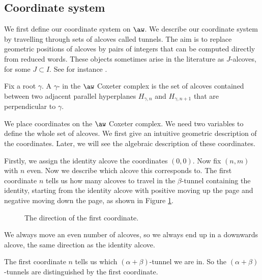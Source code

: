 \documentclass[11pt]{article}
\begin{document}
   



    

\subsection{Coordinate system}





We first define our coordinate system on $\aw$.
We describe our coordinate system by travelling through sets of alcoves called tunnels. The aim is to replace geometric positions of alcoves by pairs of integers that can be computed directly from reduced words. These objects sometimes arise in the literature as $J$-alcoves, for some $J\subset I$. See for instance \cite{GUILHOT}. 
\begin{definition}\label{tunnelsdef}
    Fix a root $\gamma$. A $\gamma$- in the $\aw$ Coxeter complex is the set of alcoves contained between two adjacent parallel hyperplanes $H_{\gamma,n}$ and $H_{\gamma,n+1}$ that are perpendicular to $\gamma$.
\end{definition}

We place coordinates on the $\aw$ Coxeter complex. We need two variables to define the whole set of alcoves. We first give an intuitive geometric description of the coordinates. Later, we will see the algebraic description of these coordinates. 


Firstly, we assign the identity alcove the coordinates $(0,0)$. Now fix $(n,m)$ with $n$ even. Now we describe which alcove this corresponds to. The first coordinate $n$ tells us how many alcoves to travel in the $\beta$-tunnel containing the identity, starting from the identity alcove
with positive moving up the page and negative moving down the page, as shown in Figure \ref{fig4}.
\begin{figure}[!htbp]
    \centering
    \def\svgwidth{0.4\textwidth}
    
    
    \caption{The direction of the first coordinate.}
    \label{fig4}
\end{figure}

We always move an even number of alcoves, so we always end up in a downwards alcove, the same direction as the identity alcove. 



The first coordinate $n$ tells us which $(\alpha+\beta)$-tunnel we are in. So the $(\alpha+\beta)$-tunnels are distinguished by the first coordinate.
\end{document}
